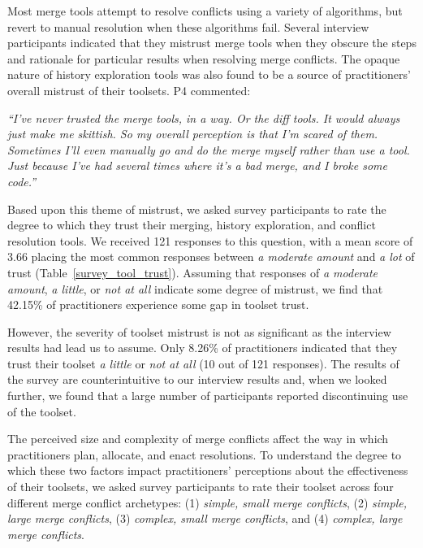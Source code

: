 Most merge tools attempt to resolve conflicts using a variety of algorithms, but revert to manual resolution when these algorithms fail.
Several interview participants indicated that they mistrust merge tools when they obscure the steps and rationale for particular results when resolving merge conflicts.
The opaque nature of history exploration tools was also found to be a source of practitioners' overall mistrust of their toolsets.
P4 commented:
\begin{displayquote}
\textit{``I've never trusted the merge tools, in a way. Or the diff tools. It would always just make me skittish. So my overall perception is that I'm scared of them. Sometimes I'll even manually go and do the merge myself rather than use a tool. Just because I've had several times where it's a bad merge, and I broke some code.''}
\end{displayquote}

Based upon this theme of mistrust, we asked survey participants to rate the degree to which they trust their merging, history exploration, and conflict resolution tools.
We received 121 responses to this question, with a mean score of 3.66 placing the most common responses between \textit{a moderate amount} and \textit{a lot} of trust (Table~\ref{survey_tool_trust}).
Assuming that responses of \textit{a moderate amount}, \textit{a little}, or \textit{not at all} indicate some degree of mistrust, we find that 42.15\% of practitioners experience some gap in toolset trust.

However, the severity of toolset mistrust is not as significant as the interview results had lead us to assume.
Only 8.26\% of practitioners indicated that they trust their toolset \textit{a little} or \textit{not at all} (10 out of 121 responses).
The results of the survey are counterintuitive to our interview results and, when we looked further, we found that a large number of participants reported discontinuing use of the toolset.

\label{tool_effectiveness}
The perceived size and complexity of merge conflicts affect the way in which practitioners plan, allocate, and enact resolutions.
To understand the degree to which these two factors impact practitioners' perceptions about the effectiveness of their toolsets, we asked survey participants to rate their toolset across four different merge conflict archetypes: (1) \textit{simple, small merge conflicts}, (2) \textit{simple, large merge conflicts}, (3) \textit{complex, small merge conflicts}, and (4) \textit{complex, large merge conflicts}.

